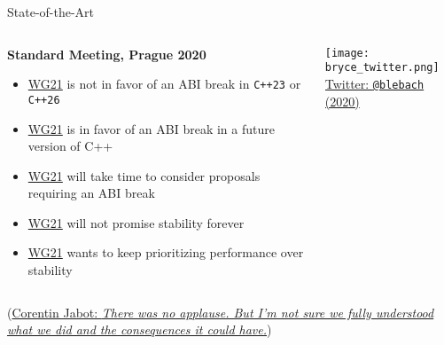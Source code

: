 \begin{frame}{State-of-the-Art}
    \begin{columns}
        \begin{column}{.45\textwidth}
            \textbf{Standard Meeting, Prague 2020}
            \begin{itemize}
                \item \href{http://www.open-std.org/jtc1/sc22/wg21/}{WG21} is not in favor of an ABI break in \texttt{C++23} or \texttt{C++26}
                \item \href{http://www.open-std.org/jtc1/sc22/wg21/}{WG21} is in favor of an ABI break in a future version of C++
                \item \href{http://www.open-std.org/jtc1/sc22/wg21/}{WG21} will take time to consider proposals requiring an ABI break 
                \item \href{http://www.open-std.org/jtc1/sc22/wg21/}{WG21} will not promise stability forever
                \item \href{http://www.open-std.org/jtc1/sc22/wg21/}{WG21} wants to keep prioritizing performance over stability
            \end{itemize}
        \end{column}
        \begin{column}{.45\textwidth}
            \centering
            \texttt{[image: bryce\_twitter.png]}\\
            {\footnotesize \href{https://twitter.com/blelbach/status/1228962495865507840}{Twitter: \texttt{@blebach} (2020)}}

        \end{column}
    \end{columns}

    \vspace*{5mm}

    (\href{https://cor3ntin.github.io/posts/abi/}{Corentin Jabot: \textit{There was no applause. But I’m not sure we fully understood what we did and the consequences it could have.}})
\end{frame}

